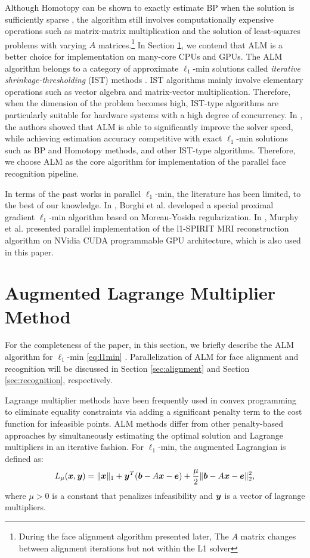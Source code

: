 \documentclass[10pt,twocolumn,letterpaper]{article}
\begin{document}
Although Homotopy can be shown to exactly estimate BP when the solution is
sufficiently sparse \cite{DonohoD2006}, the algorithm still involves
computationally expensive operations such as matrix-matrix multiplication and
the solution of least-squares problems with varying $A$
matrices.\footnote{During the face alignment algorithm presented later, The $A$
matrix changes between alignment iterations but not within the L1 solver}  In
Section \ref{sec:ALM}, we contend that ALM is a better choice for
implementation on many-core CPUs and GPUs. The ALM algorithm belongs to a
category of approximate $\ell_1$-min solutions called \emph{iterative
shrinkage-thresholding} (IST) methods \cite{WrightS2008,BeckA2009}.  IST
algorithms mainly involve elementary operations such as vector algebra and
matrix-vector multiplication. Therefore, when the dimension of the problem
becomes high, IST-type algorithms are particularly suitable for hardware
systems with a high degree of concurrency. In \cite{YangA2010-ICIP}, the
authors showed that ALM is able to significantly improve the solver speed,
while achieving estimation accuracy competitive with exact $\ell_1$-min
solutions such as BP and Homotopy methods, and other IST-type
algorithms.  Therefore, we choose ALM as the core algorithm for
implementation of the parallel face recognition pipeline.

In terms of the past works in parallel $\ell_1$-min, the literature has been
limited, to the best of our knowledge. In \cite{BorghiA2010}, Borghi et al.
developed a special proximal gradient $\ell_1$-min algorithm based on
Moreau-Yosida regularization. In \cite{MurphyM2010}, Murphy et al. presented
parallel implementation of the l1-SPIRIT MRI reconstruction algorithm on NVidia
CUDA programmable GPU architecture, which is also used in this paper.

\section{Augmented Lagrange Multiplier Method}
\label{sec:ALM}

For the completeness of the paper, in this section, we briefly describe the ALM
algorithm for $\ell_1$-min \eqref{eq:l1min} \cite{YangA2010-ICIP}
. 
Parallelization of ALM for face alignment and recognition will
be discussed in Section \ref{sec:alignment} and Section \ref{sec:recognition},
respectively.

Lagrange multiplier methods have been frequently used in convex programming to
eliminate equality constraints via adding a significant penalty term to the
cost function for infeasible points. ALM methods differ from other
penalty-based approaches by simultaneously estimating the optimal solution and
Lagrange multipliers in an iterative fashion.  For $\ell_1$-min, the augmented
Lagrangian is defined as: \begin{equation} L_\mu({\boldsymbol{x}},{\boldsymbol{y}}) = \|{\boldsymbol{x}}\|_1 +
{\boldsymbol{y}}^T({\boldsymbol{b}} - A{\boldsymbol{x}} - {\boldsymbol{e}}) + \frac{\mu}{2} \| {\boldsymbol{b}}-A{\boldsymbol{x}}-{\boldsymbol{e}} \|_2^2, \end{equation}
where $\mu > 0$ is a constant that penalizes infeasibility and ${\boldsymbol{y}}$ is a
vector of lagrange multipliers.
\end{document}
